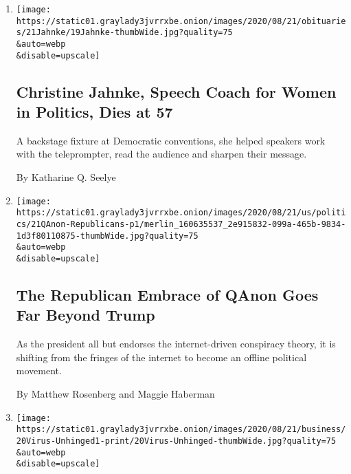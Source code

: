 \begin{enumerate}
\def\labelenumi{\arabic{enumi}.}
\item
  \href{/2020/08/20/us/christine-jahnke-dead.html}{}

  \texttt{[image: https://static01.graylady3jvrrxbe.onion/images/2020/08/21/obituaries/21Jahnke/19Jahnke-thumbWide.jpg?quality=75\\\&auto=webp\\\&disable=upscale]}

  \hypertarget{christine-jahnke-speech-coach-for-women-in-politics-dies-at-57}{%
  \subsection{Christine Jahnke, Speech Coach for Women in Politics, Dies
  at
  57}\label{christine-jahnke-speech-coach-for-women-in-politics-dies-at-57}}

  A backstage fixture at Democratic conventions, she helped speakers
  work with the teleprompter, read the audience and sharpen their
  message.

  By Katharine Q. Seelye
\item
  \href{/2020/08/20/us/politics/qanon-trump-republicans.html}{}

  \texttt{[image: https://static01.graylady3jvrrxbe.onion/images/2020/08/21/us/politics/21QAnon-Republicans-p1/merlin\_160635537\_2e915832-099a-465b-9834-1d3f80110875-thumbWide.jpg?quality=75\\\&auto=webp\\\&disable=upscale]}

  \hypertarget{the-republican-embrace-of-qanon-goes-far-beyond-trump}{%
  \subsection{The Republican Embrace of QAnon Goes Far Beyond
  Trump}\label{the-republican-embrace-of-qanon-goes-far-beyond-trump}}

  As the president all but endorses the internet-driven conspiracy
  theory, it is shifting from the fringes of the internet to become an
  offline political movement.

  By Matthew Rosenberg and Maggie Haberman
\item
  \href{/2020/08/20/business/media/unhinged-russell-crowe-theaters.html}{}

  \texttt{[image: https://static01.graylady3jvrrxbe.onion/images/2020/08/21/business/20Virus-Unhinged1-print/20Virus-Unhinged-thumbWide.jpg?quality=75\\\&auto=webp\\\&disable=upscale]}

  \hypertarget{will-americans-return-to-theaters-for-russell-crowe}{%
}
\end{enumerate}
